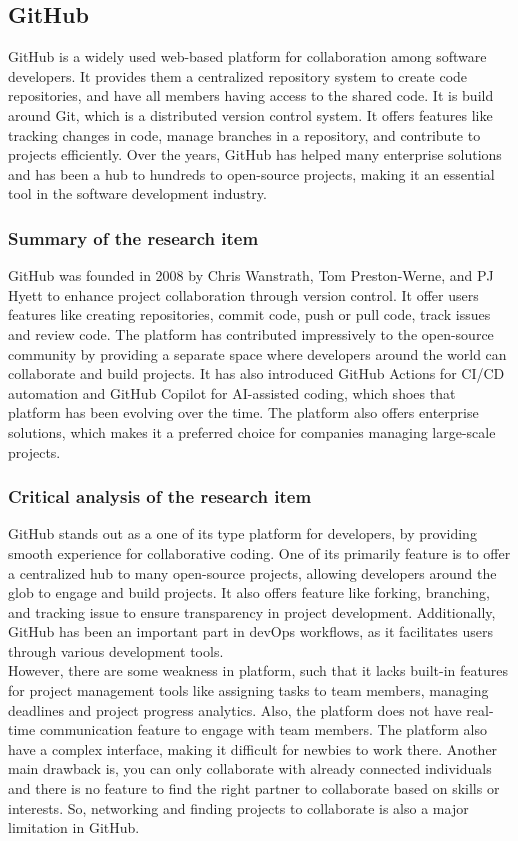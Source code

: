 \documentclass{FastFyp}
\begin{document}
\subsection{GitHub}
GitHub is a widely used web-based platform for collaboration among software developers. It provides them a centralized repository system to create code repositories, and have all members having access to the shared code. It is build around Git, which is a distributed version control system.  It offers features like tracking changes in code, manage branches in a repository, and contribute to projects efficiently. Over the years, GitHub has helped many enterprise solutions and has been a hub to hundreds to open-source projects, making it an essential tool in the software development industry.

\subsubsection{Summary of the research item}
GitHub was founded in 2008 by Chris Wanstrath, Tom Preston-Werne, and PJ Hyett to enhance project collaboration through version control. It offer users features like creating repositories, commit code, push or pull code, track issues and review code. The platform has contributed impressively to the open-source community by providing a separate space where developers around the world can collaborate and build projects. It has also introduced GitHub Actions for CI/CD automation and GitHub Copilot for AI-assisted coding, which shoes that platform has been evolving over the time. The platform also offers enterprise solutions, which makes it a preferred choice for companies managing large-scale projects. 
\subsubsection{Critical analysis of the research item}
GitHub stands out as a one of its type platform for developers, by providing smooth experience for collaborative coding. One of its primarily feature is to offer a centralized hub to many open-source projects, allowing developers around the glob to engage and build projects. It also offers feature like forking, branching, and tracking issue to ensure transparency in project development. Additionally, GitHub has been an important part in devOps workflows, as it facilitates users through various development tools. \\
However, there are some weakness in platform, such that it lacks built-in features for project management tools like assigning tasks to team members, managing deadlines and project progress analytics. Also, the platform does not have real-time communication feature to engage with team members. The platform also have a complex interface, making it difficult for newbies to work there. Another main drawback is, you can only collaborate with already connected individuals and there is no feature to find the right partner to collaborate based on skills or interests. So, networking and finding projects to collaborate is also a major limitation in GitHub.
\end{document}
